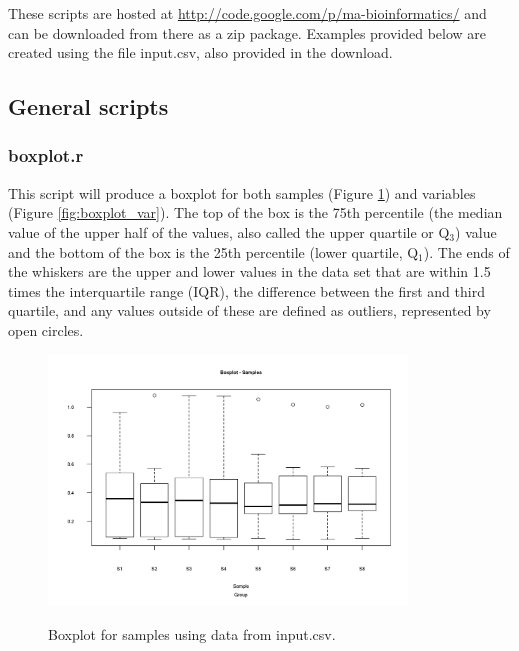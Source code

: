 \documentclass[english,a4paper,12pt]{article}
\begin{document}
These scripts are hosted at \url{http://code.google.com/p/ma-bioinformatics/} and can be downloaded from there as a zip package.
Examples provided below are created using the file \textsf{input.csv}, also provided in the download.

\newpage

\subsection*{General scripts}

\subsubsection*{boxplot.r}
This script will produce a boxplot for both samples (Figure \ref{fig:boxplot_smpl}) and variables (Figure \ref{fig:boxplot_var}). The top of the box is the 75th percentile (the median value of the upper half of the values, also called the upper quartile or Q$_3$) value and the bottom of the box is the 25th percentile (lower quartile, Q$_1$). The ends of the whiskers are the upper and lower values in the data set that are within 1.5 times the interquartile range (IQR), the difference between the first and third quartile, and any values outside of these are defined as outliers, represented by open circles.

\begin{figure}[!h]
    \centering
    \includegraphics[width=0.85\textwidth]{images/boxplot_smpl.png} \\
    \caption[Boxplot - Samples]{Boxplot for samples using data from \textsf{input.csv}.}
    \label{fig:boxplot_smpl}
\end{figure}
\end{document}
